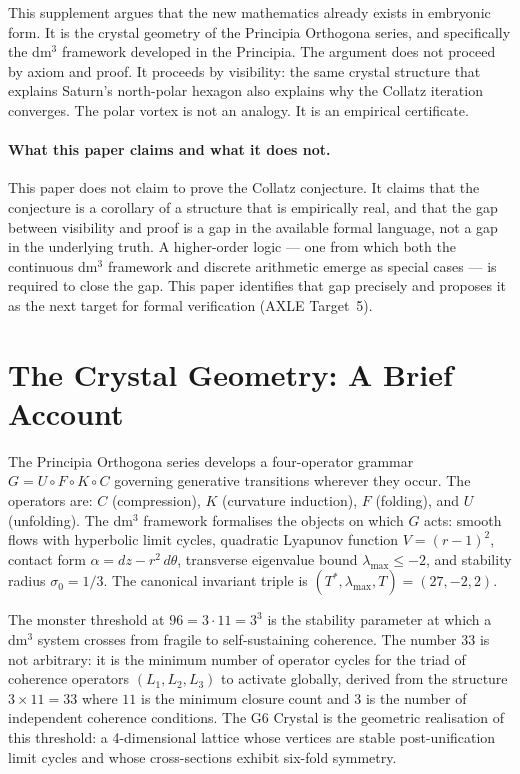 \documentclass[11pt]{article}
\begin{document}
This supplement argues that the new mathematics already exists in embryonic form. It is the
crystal geometry of the Principia Orthogona series, and specifically the dm$^3$ framework developed
in the Principia. The argument does not proceed by axiom and proof. It proceeds by visibility: the
same crystal structure that explains Saturn's north-polar hexagon also explains why the Collatz
iteration converges. The polar vortex is not an analogy. It is an empirical certificate.

\paragraph{What this paper claims and what it does not.}
This paper does not claim to prove the Collatz conjecture. It claims that the conjecture is a
corollary of a structure that is empirically real, and that the gap between visibility and proof is
a gap in the available formal language, not a gap in the underlying truth. A higher-order logic
--- one from which both the continuous dm$^3$ framework and discrete arithmetic emerge as special
cases --- is required to close the gap. This paper identifies that gap precisely and proposes it as
the next target for formal verification (AXLE Target~5).

\section{The Crystal Geometry: A Brief Account}

The Principia Orthogona series develops a four-operator grammar $G = U \circ F \circ K \circ C$
governing generative transitions wherever they occur. The operators are: $C$ (compression),
$K$ (curvature induction), $F$ (folding), and $U$ (unfolding). The dm$^3$ framework formalises
the objects on which $G$ acts: smooth flows with hyperbolic limit cycles, quadratic Lyapunov
function $V = (r-1)^2$, contact form $\alpha = dz - r^2\,d\theta$, transverse eigenvalue bound
$\lambda_{\max} \leq -2$, and stability radius $\sigma_0 = 1/3$. The canonical invariant triple
is $(T^*, \lambda_{\max}, T) = (27, -2, 2)$.

The monster threshold at $96 = 3 \cdot 11 = 3^3$ is the stability parameter at which a dm$^3$
system crosses from fragile to self-sustaining coherence. The number $33$ is not arbitrary: it is
the minimum number of operator cycles for the triad of coherence operators $(L_1, L_2, L_3)$ to
activate globally, derived from the structure $3 \times 11 = 33$ where $11$ is the minimum closure
count and $3$ is the number of independent coherence conditions. The G6 Crystal is the geometric
realisation of this threshold: a 4-dimensional lattice whose vertices are stable post-unification
limit cycles and whose cross-sections exhibit six-fold symmetry.
\end{document}
